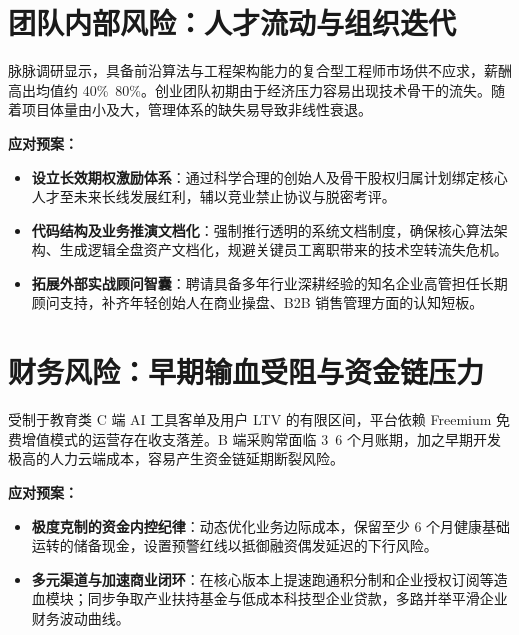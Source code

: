 \section{团队内部风险：人才流动与组织迭代}

脉脉调研显示，具备前沿算法与工程架构能力的复合型工程师市场供不应求，薪酬高出均值约 40\%~80\%。创业团队初期由于经济压力容易出现技术骨干的流失。随着项目体量由小及大，管理体系的缺失易导致非线性衰退。

\textbf{应对预案：}
\begin{itemize}
    \item \textbf{设立长效期权激励体系}：通过科学合理的创始人及骨干股权归属计划绑定核心人才至未来长线发展红利，辅以竞业禁止协议与脱密考评。
    \item \textbf{代码结构及业务推演文档化}：强制推行透明的系统文档制度，确保核心算法架构、生成逻辑全盘资产文档化，规避关键员工离职带来的技术空转流失危机。
    \item \textbf{拓展外部实战顾问智囊}：聘请具备多年行业深耕经验的知名企业高管担任长期顾问支持，补齐年轻创始人在商业操盘、B2B 销售管理方面的认知短板。
\end{itemize}

\section{财务风险：早期输血受阻与资金链压力}

受制于教育类 C 端 AI 工具客单及用户 LTV 的有限区间，平台依赖 Freemium 免费增值模式的运营存在收支落差。B 端采购常面临 3~6 个月账期，加之早期开发极高的人力云端成本，容易产生资金链延期断裂风险。

\textbf{应对预案：}
\begin{itemize}
    \item \textbf{极度克制的资金内控纪律}：动态优化业务边际成本，保留至少 6 个月健康基础运转的储备现金，设置预警红线以抵御融资偶发延迟的下行风险。
    \item \textbf{多元渠道与加速商业闭环}：在核心版本上提速跑通积分制和企业授权订阅等造血模块；同步争取产业扶持基金与低成本科技型企业贷款，多路并举平滑企业财务波动曲线。
\end{itemize}
